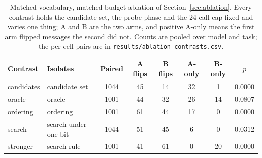 \begin{table}[t]
\centering
\small
\caption{Matched-vocabulary, matched-budget ablation of Section~\ref{sec:ablation}. Every contrast holds the candidate set, the probe phase and the 24-call cap fixed and varies one thing; A and B are the two arms, and positive A-only means the first arm flipped messages the second did not. Counts are pooled over model and task; the per-cell pairs are in \texttt{results/ablation\_contrasts.csv}.}
\label{tab:ablation}
\begin{tabular}{llcccccc}
\toprule
\textbf{Contrast} & \textbf{Isolates} & \textbf{Paired} & \textbf{A flips} & \textbf{B flips} & \textbf{A-only} & \textbf{B-only} & \textbf{$p$} \\
\midrule
 candidates & candidate set & 1044 & 45 & 14 & 32 & 1 & 0.0000 \\
 oracle & oracle & 1001 & 44 & 32 & 26 & 14 & 0.0807 \\
 ordering & ordering & 1001 & 61 & 44 & 17 & 0 & 0.0000 \\
 search & search under one bit & 1044 & 51 & 45 & 6 & 0 & 0.0312 \\
 stronger & search rule & 1001 & 41 & 61 & 0 & 20 & 0.0000 \\
\bottomrule
\end{tabular}
\end{table}
